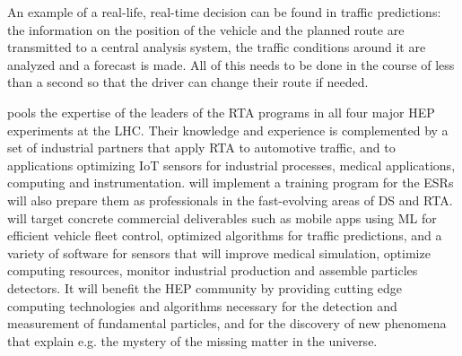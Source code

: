 An example of a real-life, real-time decision can be found in traffic predictions: the information on the position of the vehicle and the planned route are transmitted to a central analysis system, the traffic conditions around it are analyzed and a forecast is made. 
All of this needs to be done in the course of less than a second so that the driver can change their route if needed. 

\vskip2pt
\acronym pools the expertise of the leaders of the RTA programs in all four major HEP experiments at the LHC. 
Their knowledge and experience is complemented by a set of industrial partners that apply RTA to automotive traffic, and to applications optimizing IoT sensors for industrial processes, medical applications, computing and instrumentation. 
\acronym will implement a training program for the ESRs will also prepare them as professionals in the fast-evolving areas of DS and RTA.
\acronym will target concrete commercial deliverables such as 
mobile apps using ML for efficient vehicle fleet control, 
optimized algorithms for traffic predictions,
and a variety of software for sensors that will improve medical simulation,
optimize computing resources,
monitor industrial production
and assemble particles detectors. 
It will benefit the HEP community by providing cutting edge computing technologies and algorithms necessary for the detection and measurement of fundamental particles, and for the discovery of new phenomena that explain e.g. the mystery of the missing matter in the universe. 
